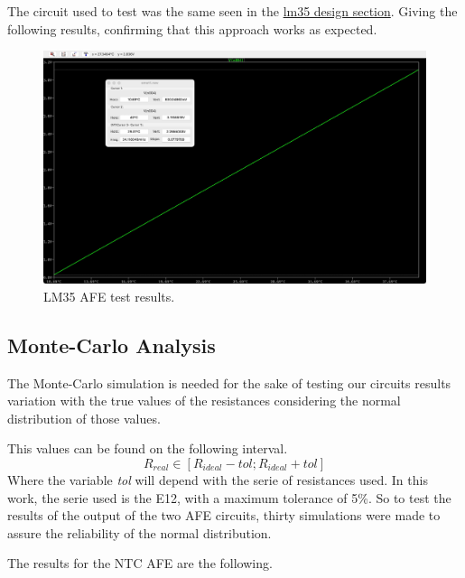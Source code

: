 \documentclass[12pt]{article}
\begin{document}
    The circuit used to test was the same seen in the \hyperref[AFELM35]{lm35 design section}.
    Giving the following results, confirming that this approach works as expected. 
    
    \begin{figure}[H] 
        \centering
        \includegraphics*[scale = 0.15]{images/LM35AFERes.jpeg}
        \caption{LM35 AFE test results.}
        \label{wrap-fig:1}
    \end{figure}

\subsection{Monte-Carlo Analysis} 
    
    The Monte-Carlo simulation is needed for the sake of testing our circuits results variation with the true values of the resistances considering 
    the normal distribution of those values. 

    This values can be found on the following interval.
    \begin{equation}
        R_{real} \in [R_{ideal} - tol; R_{ideal} + tol] 
    \end{equation}
    Where the variable \textit{tol} will depend with the serie of resistances used. 
    In this work, the serie used is the E12, with a maximum tolerance of 5\%. So to test the results of
    the output of the two AFE circuits, thirty simulations were made to assure the reliability of the normal distribution.

    The results for the NTC AFE are the following.
\end{document}
